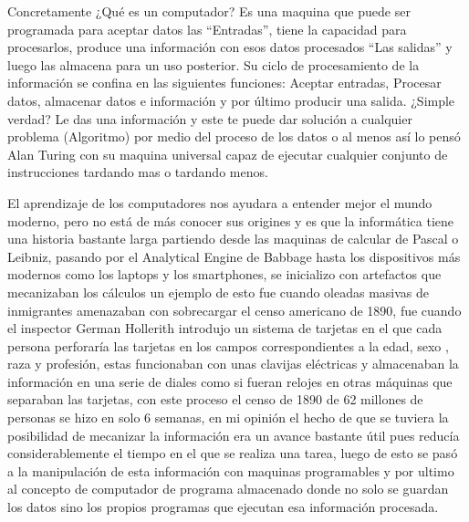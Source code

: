 \documentclass{article}
\begin{document}
\par 
\vspace{4mm}

Concretamente ¿Qué es un computador? Es una maquina que puede ser programada para aceptar datos las “Entradas”, tiene la capacidad para procesarlos, produce una información con esos datos procesados “Las salidas” y luego las almacena para un uso posterior. Su ciclo de procesamiento de la información se confina en las siguientes funciones: Aceptar entradas, Procesar datos, almacenar datos e información y por último producir una salida. ¿Simple verdad? Le das una información y este te puede dar solución a cualquier problema (Algoritmo) por medio del proceso de los datos o al menos así lo pensó Alan Turing con su maquina universal capaz de ejecutar cualquier conjunto de instrucciones tardando mas o tardando menos. 

\par 
\vspace{4mm}

El aprendizaje de los computadores nos ayudara a entender mejor el mundo moderno, pero no está de más conocer sus origines y es que la informática tiene una historia bastante larga partiendo desde las maquinas de calcular de Pascal o Leibniz, pasando por el Analytical Engine de Babbage hasta los dispositivos más modernos como los laptops y los smartphones, se inicializo con artefactos que mecanizaban los cálculos un ejemplo de esto fue cuando oleadas masivas de inmigrantes amenazaban con sobrecargar el censo americano de 1890, fue cuando el inspector German Hollerith introdujo un sistema de tarjetas en el que cada persona perforaría las tarjetas en los campos correspondientes a la edad, sexo , raza y profesión, estas funcionaban con unas clavijas eléctricas y almacenaban la información en una  serie de diales como si fueran relojes en otras máquinas que separaban las tarjetas, con este proceso el censo de 1890 de 62 millones de personas se hizo en solo 6 semanas, en mi opinión el hecho de que se tuviera la posibilidad de mecanizar la información era un avance bastante útil pues reducía considerablemente el tiempo en el que se realiza una tarea, luego de esto se pasó a la manipulación de esta información con maquinas programables y por ultimo al concepto de computador de programa almacenado donde no solo se guardan los datos sino los propios programas que ejecutan esa información procesada. 

\par 
\vspace{4mm}
\end{document}
